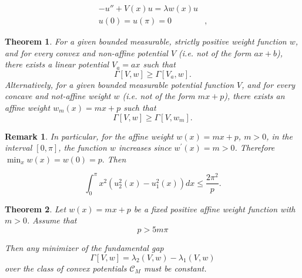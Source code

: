 \documentclass[10pt,a4paper]{amsart}
\newtheorem{thm}{Theorem}
\newtheorem{rem}{Remark}
\begin{document}
\begin{align}\label{s-l}
    {-u''+V(x)u=\lambda w(x)u}&\\
    u(0)=u(\pi)=0&,\nonumber
\end{align}                                                   

\begin{thm}\label{step}
For a given bounded measurable, strictly positive weight function $w$, and for every convex 
and non-affine potential $V$ (i.e. not of the form $ax+b$), there exists a linear potential $V_{a}=ax$ such that
$$
 \Gamma[V,w] \geq  \Gamma[V_{a},w].$$
Alternatively, for a given  
bounded measurable potential function $V$, and for every concave and not-affine
weight $w$ (i.e. not of the form $mx+p$), there exists an affine weight $w_m(x)=mx+p$ such that 
$$
 \Gamma[V,w] \geq  \Gamma[V,w_m].$$  
\end{thm}

\begin{rem}\label{rem12}
    In particular, for the affine weight $w(x)=mx+p$, $m>0$, in the interval $[0,\pi]$, the function $w$ increases since $w^{\prime}(x)=m>0$.
Therefore $\min_{x} w(x)=w(0)=p.$ Then

\[
\int_0^{\pi}x^2(u_2^2(x) -u^2_1(x))dx\leq\frac{2\pi^2}{p}.
\]
\end{rem}

\begin{thm}\label{step2}
Let $w(x)=mx+p$ be a fixed positive affine weight function with $m>0$. Assume that
\[
p>5m\pi
\]

\noindent Then any minimizer of the fundamental gap
\[
\Gamma[V,w] = \lambda_2(V,w) - \lambda_1(V,w)
\]
over the class of convex potentials $ \mathcal{C}_M$ must be constant.


    
\end{thm}
\end{document}
